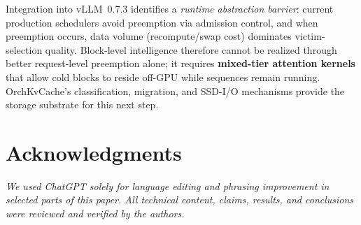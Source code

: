 \documentclass[conference]{IEEEtran}
\begin{document}
Integration into vLLM~0.7.3 identifies a \emph{runtime abstraction barrier}: current production schedulers avoid preemption via admission control, and when preemption occurs, data volume (recompute/swap cost) dominates victim-selection quality. Block-level intelligence therefore cannot be realized through better request-level preemption alone; it requires \textbf{mixed-tier attention kernels} that allow cold blocks to reside off-GPU while sequences remain running. OrchKvCache's classification, migration, and SSD-I/O mechanisms provide the storage substrate for this next step.

\section*{Acknowledgments}
\textit{We used ChatGPT solely for language editing and phrasing improvement in selected parts of this paper. All technical content, claims, results, and conclusions were reviewed and verified by the authors.}
\end{document}
